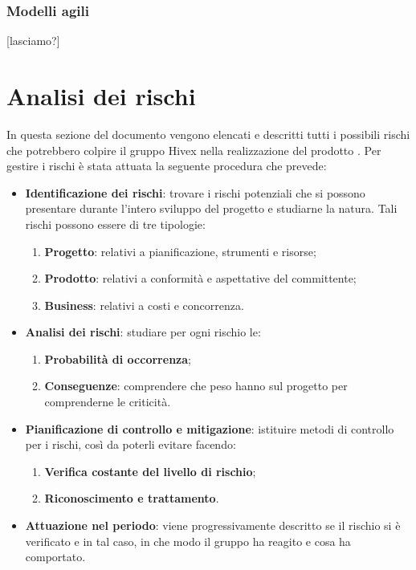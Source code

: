 		\subsubsection{Modelli agili}
[lasciamo?]



\section{Analisi dei rischi}
In questa sezione del documento vengono elencati e descritti tutti i possibili rischi che potrebbero colpire il gruppo Hivex nella realizzazione del prodotto \proj. Per gestire i rischi è stata attuata la seguente procedura che prevede:
\begin{itemize}
	\item \textbf{Identificazione dei rischi}: trovare i rischi potenziali che si possono presentare durante l'intero sviluppo del progetto e studiarne la natura. Tali rischi possono essere di tre tipologie:
	\begin{enumerate}
		\item \textbf{Progetto}: relativi a pianificazione, strumenti e risorse;
		\item \textbf{Prodotto}: relativi a conformità e aspettative del committente;
		\item \textbf{Business}: relativi a costi e concorrenza.
	\end{enumerate}
	\item \textbf{Analisi dei rischi}: studiare per ogni rischio le:
	\begin{enumerate}
		\item \textbf{Probabilità di occorrenza};
		\item \textbf{Conseguenze}: comprendere che peso hanno sul progetto per comprenderne le criticità.
	\end{enumerate}
	\item \textbf{Pianificazione di controllo e mitigazione}: istituire metodi di controllo per i rischi, così da poterli evitare facendo:
	\begin{enumerate}
		\item \textbf{Verifica costante del livello di rischio};
		\item \textbf{Riconoscimento e trattamento}.
	\end{enumerate}
	\item \textbf{Attuazione nel periodo}: viene progressivamente descritto se il rischio si è verificato e in tal caso, in che modo il gruppo ha reagito e cosa ha comportato.
\end{itemize}
